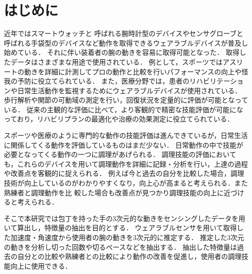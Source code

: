 \section{はじめに}
近年ではスマートウォッチと
呼ばれる腕時計型のデバイスやセンサグローブと呼ばれる手袋型のデバイスなど動作を取得できるウェアラブルデバイスが普及し始めている．
それに伴い装着者の腕の動きを容易に取得可能となった．
取得したデータはさまざまな用途で使用されている．
例として，スポーツではアスリートの動きを詳細に計測してプロの動作と比較を行いパフォーマンスの向上や怪我の予防に役立てられている．
また，医療分野では，患者のリハビリテーションや日常生活動作を監視するためにウェアラブルデバイスが使用されている．
歩行解析や関節の可動域の測定を行い，回復状況を定量的に評価が可能となっている．
従来の主観的な評価に比べて，より客観的で精密な技能評価が可能になっており，リハビリプランの最適化や治療の効果測定に役立てられている．

スポーツや医療のように専門的な動作の技能評価は進んできているが，日常生活に関係してくる動作を評価しているものはまだ少ない．
日常動作の中で技能が必要となってくる動作の一つに調理があげられる．
調理技能の評価においても，これらのデバイスを用いて調理動作を詳細に記録・分析を行い，上達の過程や改善点を客観的に捉えられる．
例えば今と過去の自分を比較した場合，調理技術が向上しているのがわかりやすくなり，向上心が高まると考えられる．また熟練者と調理動作を比
較した場合も改善点が見つかり調理技能の向上に近づけると考えられる．

そこで本研究では包丁を持った手の3次元的な動きをセンシングしたデータを用いて算出し，特徴量の抽出を目的とする．
ウェアラブルセンサを用いて取得した加速度・角速度から使用者の腕の動きを3次元的に推定する．
推定した3次元の動きを分析し切った回数や切るペースなどを抽出する．
抽出した特徴量は過去の自分との比較や熟練者との比較により動作の改善を促進し，使用者の調理技能向上に使用できる．